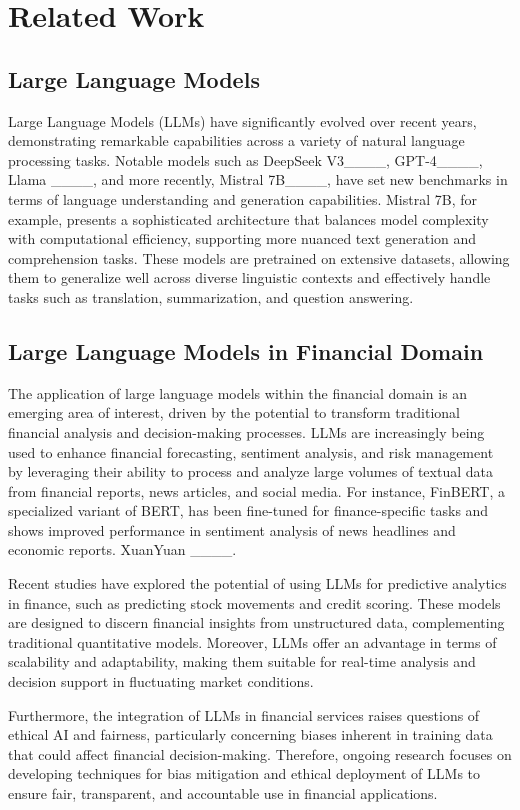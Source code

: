\section{Related Work}
\subsection{Large Language Models}
Large Language Models (LLMs) have significantly evolved over recent years, demonstrating remarkable capabilities across a variety of natural language processing tasks. Notable models such as DeepSeek V3____, GPT-4____, Llama ____, and more recently, Mistral 7B____, have set new benchmarks in terms of language understanding and generation capabilities. Mistral 7B, for example, presents a sophisticated architecture that balances model complexity with computational efficiency, supporting more nuanced text generation and comprehension tasks. These models are pretrained on extensive datasets, allowing them to generalize well across diverse linguistic contexts and effectively handle tasks such as translation, summarization, and question answering.

\subsection{Large Language Models in Financial Domain}
The application of large language models within the financial domain is an emerging area of interest, driven by the potential to transform traditional financial analysis and decision-making processes. LLMs are increasingly being used to enhance financial forecasting, sentiment analysis, and risk management by leveraging their ability to process and analyze large volumes of textual data from financial reports, news articles, and social media. For instance, FinBERT, a specialized variant of BERT, has been fine-tuned for finance-specific tasks and shows improved performance in sentiment analysis of news headlines and economic reports. XuanYuan ____.

Recent studies have explored the potential of using LLMs for predictive analytics in finance, such as predicting stock movements and credit scoring. These models are designed to discern financial insights from unstructured data, complementing traditional quantitative models. Moreover, LLMs offer an advantage in terms of scalability and adaptability, making them suitable for real-time analysis and decision support in fluctuating market conditions.

Furthermore, the integration of LLMs in financial services raises questions of ethical AI and fairness, particularly concerning biases inherent in training data that could affect financial decision-making. Therefore, ongoing research focuses on developing techniques for bias mitigation and ethical deployment of LLMs to ensure fair, transparent, and accountable use in financial applications.